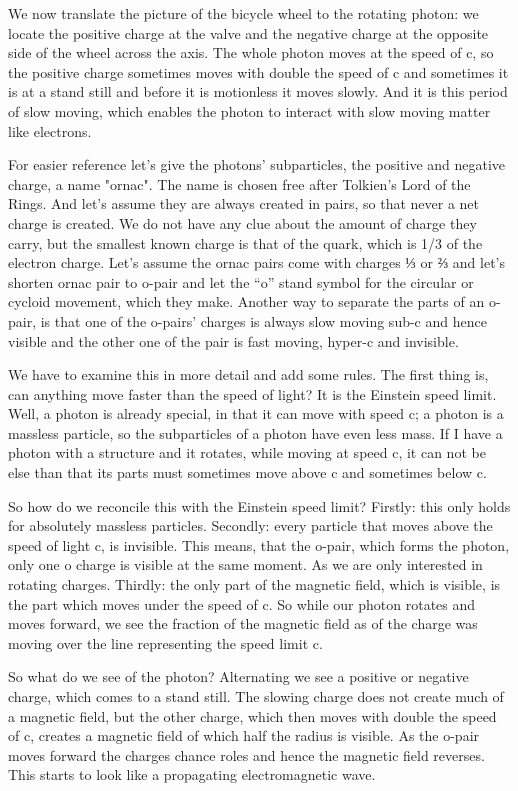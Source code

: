 We now translate the picture of the bicycle wheel to the rotating photon: we locate the positive charge at the valve and the negative charge at the opposite side of the wheel across the axis. The whole photon moves at the speed of c, so the positive charge sometimes moves with double the speed of c and sometimes it is at a stand still and before it is motionless it moves slowly. And it is this period of slow moving, which enables the photon to interact with slow moving matter like electrons.

For easier reference let's give the photons'  subparticles, the positive and negative charge, a name "ornac". The name is chosen free after Tolkien's Lord of the Rings.
And let's assume they are always created in pairs, so that never a net charge is created. We do not have any clue about the amount of charge they carry, but the smallest known charge is that of the quark, which is  1/3 of the electron charge. Let's assume the ornac pairs come with charges ⅓ or  ⅔ and let's shorten ornac pair to o-pair and let the “o” stand symbol for the  circular or cycloid movement, which they make. Another way to separate the parts of an o-pair, is that one of the o-pairs’ charges is always slow moving sub-c and hence visible and the other one of the pair is fast moving, hyper-c and invisible.

We have to examine this in more detail and add some rules. The first thing is, can anything move faster than the speed of light? It is the Einstein speed limit.
Well, a photon is already special, in that it can move with speed c; a photon is a massless particle, so the subparticles of a photon have even less mass. 
If I have a photon with a structure and it rotates, while moving at speed c, it can not be else than that its parts must sometimes move above c and sometimes below c.

So how do we reconcile this with the Einstein speed limit? Firstly: this only holds for absolutely massless particles.
Secondly: every particle that moves above the speed of light c, is invisible. This means, that the o-pair, which forms the photon, only one o charge is visible at the same moment.
As we are only interested in rotating charges. Thirdly: the only part of the magnetic field, which is visible, is the part which moves under the speed of c. So while our photon rotates and moves forward, we see the fraction of the magnetic field as of the charge was moving over the line representing the speed limit c.

So what do we see of the photon? Alternating we see a positive or negative charge, which comes to a stand still. The slowing charge does not create much of a magnetic field, but the other charge, which then moves with double the speed of c, creates a magnetic field of which half the radius is visible.
As the o-pair moves forward the charges chance roles and hence the magnetic field reverses. This starts to look like a propagating electromagnetic wave.

